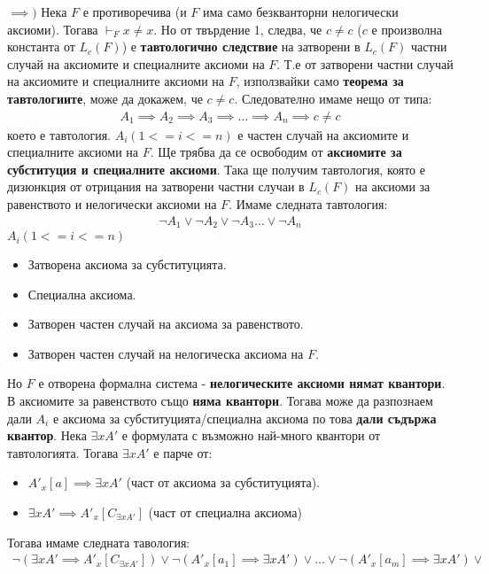 \documentclass[french]{article}
\begin{document}
$\implies )$ Нека $F$ е противоречива (и $F$  има само безкванторни нелогически аксиоми). Тогава $\vdash_F x \neq x $. Но от твърдение 1, следва, че $c \neq c$ ($c$ е произволна константа от $L_c(F)$) е \textbf{тавтологично следствие} на затворени в $L_c(F)$ частни случай на аксиомите и специалните аксиоми на $F$. \newline
Т.е от затворени частни случай на аксиомите и специалните аксиоми на $F$, използвайки само \textbf{теорема за тавтологиите}, може да докажем, че $c \neq c$.
Следователно имаме нещо от типа:
\begin{align*}
A_1 \implies A_2 \implies A_3 \implies \dots \implies A_n \implies c \neq c
\end{align*}
което е тавтология. $A_i (1<= i <= n)$ е частен случай на аксиомите и специалните аксиоми на $F$.
Ще трябва да се освободим от \textbf{аксиомите за субституция и специалните аксиоми}.
Така ще получим тавтология, която е дизюнкция от отрицания на затворени частни случаи в $L_c(F)$ на аксиоми за равенството и нелогически аксиоми на $F$.
Имаме следната тавтология:
\begin{align*}
\neg A_1 \lor \neg A_2 \lor \neg A_3 \dots \lor \neg A_n
\end{align*}
$A_i (1<= i <= n)$
\begin{itemize} 
	\item Затворена аксиома за субституцията.
	\item Специална аксиома.
	\item Затворен частен случай на аксиома за равенството.
	\item Затворен частен случай на нелогическа аксиома на $F$.
\end{itemize}
Но $F$ е отворена формална система - \textbf{нелогическите аксиоми нямат квантори}. В аксиомите за равенството също \textbf{няма квантори}.
Тогава може да разпознаем дали $A_i$ е аксиома за субституцията/специална аксиома по това \textbf{дали съдържа квантор}. \newline
Нека $\exists x A'$ е формулата с възможно най-много квантори от тавтологията.
Тогава $\exists x A'$ е парче от: 
\begin{itemize} 
	\item $A'_x[a] \implies \exists x A'$ (част от аксиома за субституцията).
	\item $\exists x A' \implies A'_x[C_{\exists x A'}]$ (част от специална аксиома)
\end{itemize}
Тогава имаме следната тавология:
\begin{align*}
\neg (\exists x A' \implies A'_x[C_{\exists x A'}]) \lor 	\neg (A'_x[a_1] \implies \exists x A') \lor \dots 	\lor \neg(A'_x[a_m] \implies \exists x A')  \lor 
\end{align*}
\end{document}

